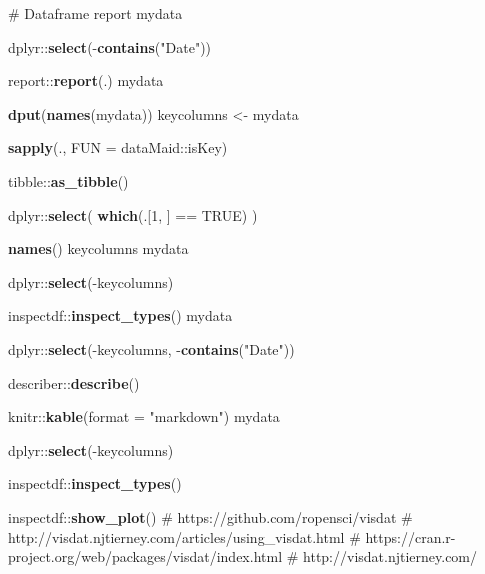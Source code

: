 \documentclass[
]{article}
\newenvironment{Shaded}{\begin{snugshade}}{\end{snugshade}}
\newcommand{\CommentTok}[1]{\textcolor[rgb]{0.54,0.53,0.53}{#1}}
\newcommand{\DataTypeTok}[1]{\textcolor[rgb]{0.00,0.34,0.68}{#1}}
\newcommand{\DecValTok}[1]{\textcolor[rgb]{0.69,0.50,0.00}{#1}}
\newcommand{\KeywordTok}[1]{\textcolor[rgb]{0.12,0.11,0.11}{\textbf{#1}}}
\newcommand{\NormalTok}[1]{\textcolor[rgb]{0.12,0.11,0.11}{#1}}
\newcommand{\OperatorTok}[1]{\textcolor[rgb]{0.12,0.11,0.11}{#1}}
\newcommand{\OtherTok}[1]{\textcolor[rgb]{0.00,0.43,0.16}{#1}}
\newcommand{\StringTok}[1]{\textcolor[rgb]{0.75,0.01,0.01}{#1}}
\begin{document}
\begin{Shaded}
\begin{Highlighting}[]
{{\CommentTok{# Dataframe report}
\NormalTok{mydata }\OperatorTok{%>%}\StringTok{ }
\StringTok{  }\NormalTok{dplyr}\OperatorTok{::}\KeywordTok{select}\NormalTok{(}\OperatorTok{-}\KeywordTok{contains}\NormalTok{(}\StringTok{"Date"}\NormalTok{)) }\OperatorTok{%>%}
\StringTok{  }\NormalTok{report}\OperatorTok{::}\KeywordTok{report}\NormalTok{(.)}
\NormalTok{mydata }\OperatorTok{%>%}\StringTok{ }\NormalTok{explore}\OperatorTok{::}\KeywordTok{describe_tbl}\NormalTok{()}
\KeywordTok{dput}\NormalTok{(}\KeywordTok{names}\NormalTok{(mydata))}
\NormalTok{keycolumns <-}\StringTok{  }
\StringTok{    }\NormalTok{mydata }\OperatorTok{%>%}\StringTok{  }
\StringTok{    }\KeywordTok{sapply}\NormalTok{(., }\DataTypeTok{FUN =}\NormalTok{ dataMaid}\OperatorTok{::}\NormalTok{isKey) }\OperatorTok{%>%}\StringTok{  }
\StringTok{    }\NormalTok{tibble}\OperatorTok{::}\KeywordTok{as_tibble}\NormalTok{() }\OperatorTok{%>%}\StringTok{  }
\StringTok{    }\NormalTok{dplyr}\OperatorTok{::}\KeywordTok{select}\NormalTok{(  }
        \KeywordTok{which}\NormalTok{(.[}\DecValTok{1}\NormalTok{, ] }\OperatorTok{==}\StringTok{ }\OtherTok{TRUE}\NormalTok{)  }
\NormalTok{    ) }\OperatorTok{%>%}\StringTok{   }
\StringTok{    }\KeywordTok{names}\NormalTok{()  }
\NormalTok{keycolumns  }
\NormalTok{mydata }\OperatorTok{%>%}\StringTok{ }
\StringTok{  }\NormalTok{dplyr}\OperatorTok{::}\KeywordTok{select}\NormalTok{(}\OperatorTok{-}\NormalTok{keycolumns) }\OperatorTok{%>%}\StringTok{ }
\NormalTok{inspectdf}\OperatorTok{::}\KeywordTok{inspect_types}\NormalTok{()}
\NormalTok{mydata }\OperatorTok{%>%}\StringTok{ }
\StringTok{    }\NormalTok{dplyr}\OperatorTok{::}\KeywordTok{select}\NormalTok{(}\OperatorTok{-}\NormalTok{keycolumns,}
           \OperatorTok{-}\KeywordTok{contains}\NormalTok{(}\StringTok{"Date"}\NormalTok{)) }\OperatorTok{%>%}\StringTok{ }
\StringTok{  }\NormalTok{describer}\OperatorTok{::}\KeywordTok{describe}\NormalTok{() }\OperatorTok{%>%}\StringTok{ }
\StringTok{  }\NormalTok{knitr}\OperatorTok{::}\KeywordTok{kable}\NormalTok{(}\DataTypeTok{format =} \StringTok{"markdown"}\NormalTok{)}
\NormalTok{mydata }\OperatorTok{%>%}\StringTok{ }
\StringTok{    }\NormalTok{dplyr}\OperatorTok{::}\KeywordTok{select}\NormalTok{(}\OperatorTok{-}\NormalTok{keycolumns) }\OperatorTok{%>%}\StringTok{ }
\StringTok{  }\NormalTok{inspectdf}\OperatorTok{::}\KeywordTok{inspect_types}\NormalTok{() }\OperatorTok{%>%}\StringTok{ }
\StringTok{  }\NormalTok{inspectdf}\OperatorTok{::}\KeywordTok{show_plot}\NormalTok{()}
\CommentTok{# https://github.com/ropensci/visdat}
\CommentTok{# http://visdat.njtierney.com/articles/using_visdat.html}
\CommentTok{# https://cran.r-project.org/web/packages/visdat/index.html}
\CommentTok{# http://visdat.njtierney.com/}

}}}}}}}}}}}}}}}}}
\end{Highlighting}
\end{Shaded}
\end{document}
